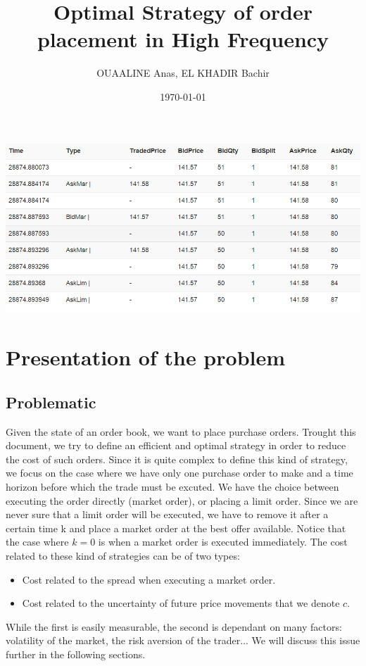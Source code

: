 \documentclass{article}
\title{Optimal Strategy of order placement in High Frequency  }
\author{OUAALINE Anas, EL KHADIR Bachir}
\date \today
\begin{document}
\maketitle

 \includegraphics[scale=0.75]{img/donnees.png}

\tableofcontents

\section{Presentation of the problem}

\subsection{Problematic}
Given the state of an order book, we want to place purchase orders. Trought this document, we try to define an efficient and optimal strategy in order to reduce the cost of such orders. Since it is quite complex to define this kind of strategy, we focus on the case where we have only one purchase order to make and a time horizon before which the trade must be excuted. We have the choice between executing the order directly (market order), or placing a limit order. Since we are never sure that a limit order will be executed, we have to remove it after a certain time k and place a market order at the best offer available. Notice that the case where $k = 0$ is when a market order is executed immediately.
The cost related to these kind of strategies can be of two types:

\begin{itemize}
	\item Cost related to the spread when executing a market order.
	\item Cost related to the uncertainty of future price movements that we denote $c$.
\end{itemize}
While the first is easily measurable, the second is dependant on many factors: volatility of the market, the risk aversion of the trader... 
We will discuss this issue further in the following sections.
\end{document}
